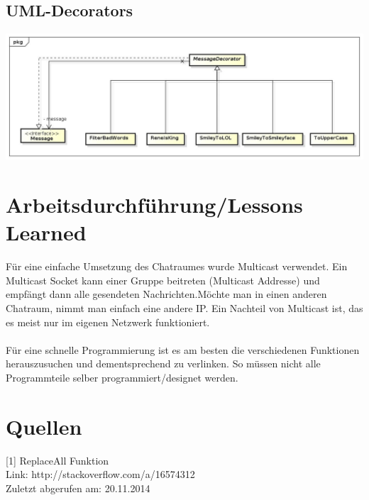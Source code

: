 \documentclass[a4paper, 11pt]{article}
\begin{document}
\newpage
\subsection{UML-Decorators}
\includegraphics[width=15.5cm]{Decorators}


\section{Arbeitsdurchführung/Lessons Learned}
Für eine einfache Umsetzung des Chatraumes wurde Multicast verwendet. Ein Multicast Socket kann einer Gruppe beitreten (Multicast Addresse) und empfängt dann alle gesendeten Nachrichten.Möchte man in einen anderen Chatraum, nimmt man einfach eine andere IP. Ein Nachteil von Multicast ist, das es meist nur im eigenen Netzwerk funktioniert.
\\\\
Für eine schnelle Programmierung ist es am besten die verschiedenen Funktionen herauszusuchen und dementsprechend zu verlinken.
So müssen nicht alle Programmteile selber programmiert/designet werden.



\section{Quellen}
[1] ReplaceAll Funktion \\
Link: http://stackoverflow.com/a/16574312 \\
Zuletzt abgerufen am: 20.11.2014 \\
\end{document}
